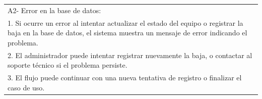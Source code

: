 \documentclass[stu, 12pt, letterpaper, donotrepeattitle, floatsintext, natbib]{apa7}
\begin{document}
\begin{longtable}{@{} p{16.5cm} @{}}
    A2- Error en la base de datos:                                                                                                                                                                                                    \\
    \hspace{1cm}1. Si ocurre un error al intentar actualizar el estado del equipo o registrar la baja en la base de datos, el sistema muestra un mensaje de error indicando el problema.                                              \\
    \hspace{1cm}2. El administrador puede intentar registrar nuevamente la baja, o contactar al soporte técnico si el problema persiste.                                                                                              \\
    \hspace{1cm}3. El flujo puede continuar con una nueva tentativa de registro o finalizar el caso de uso.                                                                                                                           \\ \bottomrule
\end{longtable}
\newpage
\end{document}
